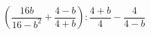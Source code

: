 \begin{ex}[type=expression]
	\begin{condition}
		\( \left( \dfrac{16b}{16-b^2}+\dfrac{4-b}{4+b} \right):\dfrac{4+b}{4}-\dfrac{4}{4-b} \)
	\end{condition}
\end{ex}